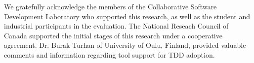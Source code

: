 \documentclass[smallextended]{svjour3}     %
\begin{document}
\begin{acknowledgements}
We gratefully acknowledge the members of the Collaborative Software 
Development Laboratory who supported this research, 
as well as the student and industrial participants in the evaluation.  
The National Reseach Council of Canada supported the initial stages of this research under a cooperative agreement. 
Dr. Burak Turhan of University of Oulu, Finland, provided valuable comments and information regarding
tool support for TDD adoption.

\end{acknowledgements}


\end{document}
